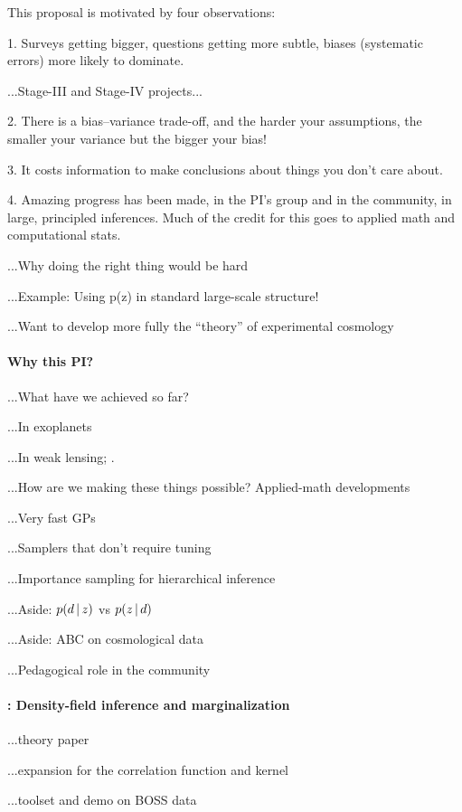 \documentclass[12pt]{article}
\begin{document}
This proposal is motivated by four observations:

1. Surveys getting bigger, questions getting more subtle, biases
(systematic errors) more likely to dominate.

...Stage-III and Stage-IV projects...

2. There is a bias--variance trade-off, and the harder your
assumptions, the smaller your variance but the bigger your bias!

3. It costs information to make conclusions about things you don't
care about.

4. Amazing progress has been made, in the PI's group and in the
community, in large, principled inferences.  Much of the credit for
this goes to applied math and computational stats.

...Why doing the right thing would be hard

...Example:  Using p(z) in standard large-scale structure!

...Want to develop more fully the ``theory'' of experimental cosmology

\paragraph{Why this PI?}
...What have we achieved so far?

...In exoplanets

...In weak lensing; \thetractor.

...How are we making these things possible?  Applied-math developments

...Very fast GPs

...Samplers that don't require tuning

...Importance sampling for hierarchical inference

...Aside:  $p(d\,|\, z)$ vs $p(z\,|\, d)$

...Aside:  ABC on cosmological data

...Pedagogical role in the community

\paragraph{: Density-field inference and marginalization}

...theory paper

...expansion for the correlation function and kernel

...toolset and demo on BOSS data
\end{document}
